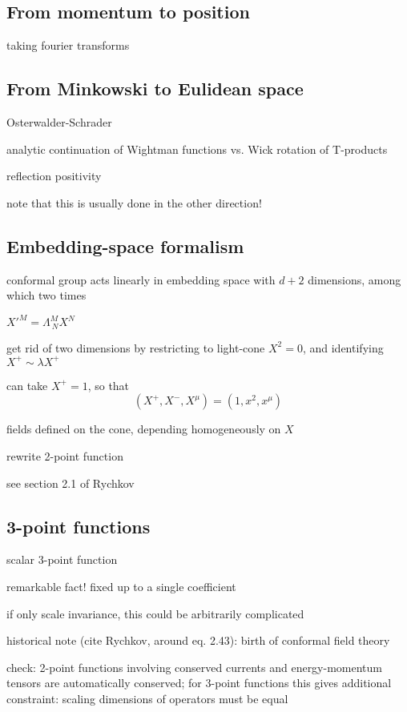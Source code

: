 \documentclass[a4paper,12pt]{article}
\numberwithin{equation}{section}
\begin{document}
\subsection{From momentum to position}

taking fourier transforms

\subsection{From Minkowski to Eulidean space}

Osterwalder-Schrader

analytic continuation of Wightman functions vs. Wick rotation of T-products

reflection positivity

note that this is usually done in the other direction!

\subsection{Embedding-space formalism}

conformal group acts linearly in embedding space with $d+2$ dimensions, among which two times

$X'^M = \Lambda^M_{~N} X^N$

get rid of two dimensions by restricting to light-cone $X^2 = 0$, and identifying $X^+ \sim \lambda X^+$


can take $X^+ = 1$, so that
\begin{equation}
	(X^+, X^-, X^\mu) = (1, x^2, x^\mu)
\end{equation}


fields defined on the cone, depending homogeneously on $X$

rewrite 2-point function


see section 2.1 of Rychkov

\subsection{3-point functions}

scalar 3-point function

remarkable fact! fixed up to a single coefficient

if only scale invariance, this could be arbitrarily complicated

historical note (cite Rychkov, around eq. 2.43): birth of conformal field theory


check: 2-point functions involving conserved currents and energy-momentum tensors are automatically conserved; for 3-point functions this gives additional constraint: scaling dimensions of operators must be equal
\end{document}
